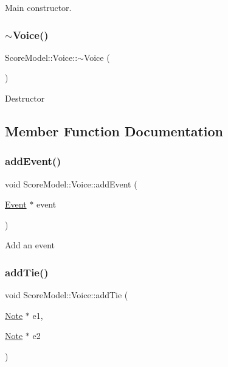 Main constructor. \mbox{\label{classScoreModel_1_1Voice_a60df4b72aa67feecbf46ff57e4c28f14}} 
\subsubsection{\texorpdfstring{$\sim$Voice()}{~Voice()}}
{\footnotesize\ttfamily Score\+Model\+::\+Voice\+::$\sim$\+Voice (\begin{DoxyParamCaption}{ }\end{DoxyParamCaption})}

Destructor 

\subsection{Member Function Documentation}
\mbox{\label{classScoreModel_1_1Voice_a69f704500f77554d6f35eb9afa29285d}} 
\subsubsection{\texorpdfstring{addEvent()}{addEvent()}}
{\footnotesize\ttfamily void Score\+Model\+::\+Voice\+::add\+Event (\begin{DoxyParamCaption}\item[{\mbox{\hyperlink{classScoreModel_1_1Event}{Event}} $\ast$}]{event }\end{DoxyParamCaption})}

Add an event \mbox{\label{classScoreModel_1_1Voice_a93951ee88d70e35ade3febe8c7ed571c}} 
\subsubsection{\texorpdfstring{addTie()}{addTie()}}
{\footnotesize\ttfamily void Score\+Model\+::\+Voice\+::add\+Tie (\begin{DoxyParamCaption}\item[{\mbox{\hyperlink{classScoreModel_1_1Note}{Note}} $\ast$}]{e1,  }\item[{\mbox{\hyperlink{classScoreModel_1_1Note}{Note}} $\ast$}]{e2 }\end{DoxyParamCaption})}

